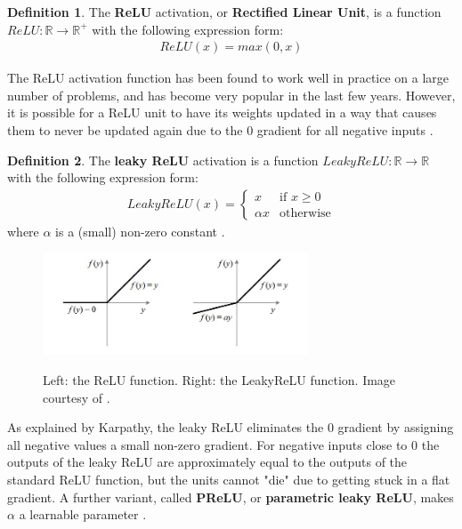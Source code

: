 \documentclass[12pt, titlepage]{report}
\theoremstyle{definition}
\newtheorem{definition}{Definition}
\begin{document}
\begin{definition}
The \textbf{ReLU} activation, or \textbf{Rectified Linear Unit}, is a function $ReLU: \mathbb{R} \rightarrow \mathbb{R}^+$ with the following expression form:
\begin{gather}\label{eq:relu}
ReLU(x) = max(0, x)
\end{gather}
\end{definition}

The ReLU activation function has been found to work well in practice on a large number of problems, and has become very popular in the last few years. However, it is possible for a ReLU unit to have its weights updated in a way that causes them to never be updated again due to the 0 gradient for all negative inputs \cite[Neural Networks Part 1: Setting up the Architecture]{karpathy2017cs231n}.

\begin{definition}
The \textbf{leaky ReLU} activation is a function $LeakyReLU: \mathbb{R} \rightarrow \mathbb{R}$ with the following expression form:
\begin{gather}\label{eq:leakyrelu}
LeakyReLU(x) = 
\begin{cases}
    x 							 & \text{if } x\geq 0\\
    \alpha{x}             & \text{otherwise}
\end{cases}
\end{gather}
where $\alpha$ is a (small) non-zero constant \cite[Neural Networks Part 1: Setting up the Architecture]{karpathy2017cs231n}.
\end{definition}

\begin{figure}
\centering
\includegraphics[width=0.7\textwidth]{img/relu.jpg}\\
\caption{Left: the ReLU function. Right: the LeakyReLU function. Image courtesy of \cite{sharma2017activation}.}
\label{figure:relu}
\end{figure}

As explained by Karpathy, the leaky ReLU eliminates the 0 gradient by assigning all negative values a small non-zero gradient. For negative inputs close to 0 the outputs of the leaky ReLU are approximately equal to the outputs of the standard ReLU function, but the units cannot "die" due to getting stuck in a flat gradient. A further variant, called \textbf{PReLU}, or \textbf{parametric leaky ReLU}, makes $\alpha$ a learnable parameter  \cite[Neural Networks Part 1: Setting up the Architecture]{karpathy2017cs231n}.
\end{document}
